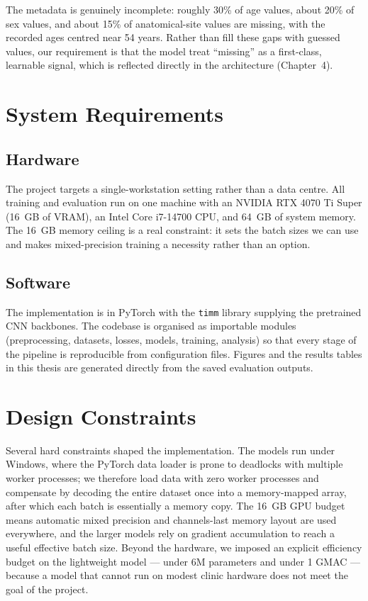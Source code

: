 The metadata is genuinely incomplete: roughly 30\% of age values, about 20\% of
sex values, and about 15\% of anatomical-site values are missing, with the
recorded ages centred near 54 years. Rather than fill these gaps with guessed
values, our requirement is that the model treat ``missing'' as a first-class,
learnable signal, which is reflected directly in the architecture (Chapter~4).

\section{System Requirements}

\subsection{Hardware}

The project targets a single-workstation setting rather than a data centre. All
training and evaluation run on one machine with an NVIDIA RTX 4070 Ti Super
(16~GB of VRAM), an Intel Core i7-14700 CPU, and 64~GB of system memory. The
16~GB memory ceiling is a real constraint: it sets the batch sizes we can use and
makes mixed-precision training a necessity rather than an option.

\subsection{Software}

The implementation is in PyTorch with the \texttt{timm} library supplying the
pretrained CNN backbones. The codebase is organised as importable modules
(preprocessing, datasets, losses, models, training, analysis) so that every
stage of the pipeline is reproducible from configuration files. Figures and the
results tables in this thesis are generated directly from the saved evaluation
outputs.

\section{Design Constraints}

Several hard constraints shaped the implementation. The models run under Windows,
where the PyTorch data loader is prone to deadlocks with multiple worker
processes; we therefore load data with zero worker processes and compensate by
decoding the entire dataset once into a memory-mapped array, after which each
batch is essentially a memory copy. The 16~GB GPU budget means automatic mixed
precision and channels-last memory layout are used everywhere, and the
larger models rely on gradient accumulation to reach a useful effective batch
size. Beyond the hardware, we imposed an explicit efficiency budget on the
lightweight model --- under 6M parameters and under 1 GMAC --- because a model
that cannot run on modest clinic hardware does not meet the goal of the project.

